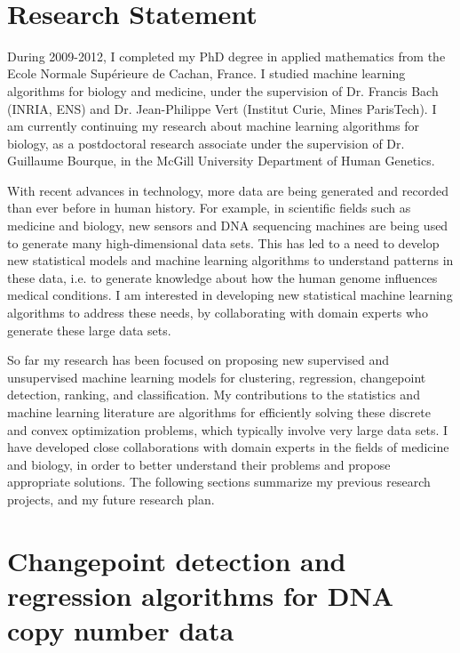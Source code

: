 \documentclass{article}
\begin{document}
 \mbox{ }

\section*{\centering Research Statement}

During 2009-2012, I completed my PhD degree in applied mathematics
from the Ecole Normale Sup\'erieure de Cachan, France. I studied
machine learning algorithms for biology and medicine, under the
supervision of Dr. Francis Bach (INRIA, ENS) and Dr. Jean-Philippe
Vert (Institut Curie, Mines ParisTech). I am currently continuing my
research about machine learning algorithms for biology, as a
postdoctoral research associate under the supervision of Dr. Guillaume
Bourque, in the McGill University Department of Human Genetics.

With recent advances in technology, more data are being generated and
recorded than ever before in human history. For example, in scientific
fields such as medicine and biology, new sensors and DNA sequencing
machines are being used to generate many high-dimensional data
sets. This has led to a need to develop new statistical models and
machine learning algorithms to understand patterns in these data, i.e.
to generate knowledge about how the human genome influences medical
conditions. I am interested in developing new statistical machine
learning algorithms to address these needs, by collaborating with
domain experts who generate these large data sets.

So far my research has been focused on proposing new supervised and
unsupervised machine learning models for clustering, regression,
changepoint detection, ranking, and classification. My contributions
to the statistics and machine learning literature are algorithms for
efficiently solving these discrete and convex optimization problems,
which typically involve very large data sets. I have developed close
collaborations with domain experts in the fields of medicine and
biology, in order to better understand their problems and propose
appropriate solutions. The following sections summarize my previous
research projects, and my future research plan.

\section{Changepoint detection and regression algorithms for DNA copy
  number data}
\end{document}
